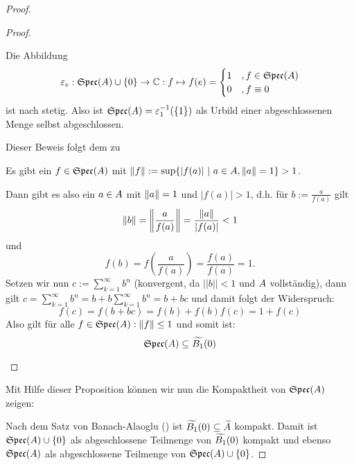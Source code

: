 \begin{proof}
\begin{proof}
\begin{proofenum}
	\item %
	Die Abbildung 
	\[\varepsilon_e: \mathfrak{Spec}(A) \cup \{0\} \to \mathbb{C}: f \mapsto f(e) = \begin{cases} 1 &, f \in \mathfrak{Spec}(A) \\ 0 &, f \equiv 0 \end{cases}\]
	ist nach  stetig. Also ist $\mathfrak{Spec}(A) = \varepsilon_1^{-1}(\{1\})$ als Urbild einer abgeschlossenen Menge selbst abgeschlossen.
	
	\item Dieser Beweis folgt dem zu \cite[Lemma IX.2.2]{Werner2011}
	
	\Ann Es gibt ein $f \in \mathfrak{Spec}(A)$ mit $\left\lVert f\right\rVert := \sup\{|f(a)| ~|~ a\in A, \left\lVert a\right\rVert = 1\} > 1$. 
	
	Dann gibt es also ein $a \in A$ mit $\left\lVert a\right\rVert = 1$ und $|f(a)| > 1$, d.h. für $b := \frac{a}{f(a)}$ gilt
	\[ \left\lVert b\right\rVert = \left\lVert\frac{a}{f(a)}\right\rVert = \frac{\left\lVert a\right\rVert}{|f(a)|} < 1 \]
	und
	\[ f(b) = f\left(\frac{a}{f(a)}\right) = \frac{f(a)}{f(a)} = 1.\]
	Setzen wir nun $c := \sum_{k=1}^\infty b^n$ (konvergent, da $||b|| < 1$ und $A$ vollständig), dann gilt $c = \sum_{k=1}^\infty b^n = b + b\sum_{k=1}^\infty b^n = b+bc$ und damit folgt der Widerspruch:
	\[f(c) = f(b+bc) = f(b) + f(b)f(c) = 1 + f(c)\]
	Also gilt für alle $f \in \mathfrak{Spec}(A): \left\lVert f\right\rVert \leq 1$ und somit ist:
	\[\mathfrak{Spec}(A) \subseteq \widetilde{B_1}(0)\]\end{proofenum}
\end{proof}

Mit Hilfe dieser Proposition können wir nun die Kompaktheit von $\mathfrak{Spec}(A)$ zeigen:

Nach dem Satz von Banach-Alaoglu () ist $\widetilde{B_1}(0) \subseteq \widetilde{A}$ kompakt. Damit ist $\mathfrak{Spec}(A)\cup\{0\}$ als abgeschlossene Teilmenge von $\widetilde{B_1}(0)$ kompakt und ebenso $\mathfrak{Spec}(A)$ als abgeschlossene Teilmenge von $\mathfrak{Spec}(A)\cup\{0\}$.
\end{proof}


